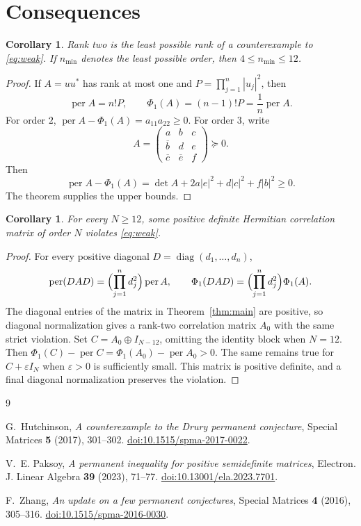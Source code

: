 \documentclass[11pt]{amsart}
\newcommand{\permanent}{\operatorname{per}}
\newcommand{\PhiOne}{\Phi_1}
\newtheorem{corollary}[theorem]{Corollary}
\begin{document}
\section{Consequences}

\begin{corollary}\label{cor:minimal}
Rank two is the least possible rank of a counterexample to \eqref{eq:weak}.
If $n_{\min}$ denotes the least possible order, then
$4\leq n_{\min}\leq12$.
\end{corollary}

\begin{proof}
If $A=uu^*$ has rank at most one and
$P=\prod_{j=1}^n|u_j|^2$, then
\[
  \permanent A=n!P,
  \qquad
  \PhiOne(A)=(n-1)!P=\frac1n\permanent A.
\]
For order $2$, $\permanent A-\PhiOne(A)=a_{11}a_{22}\geq0$. For order $3$,
write
\[
 A=\begin{pmatrix}
 a&b&c\\ \overline b&d&e\\ \overline c&\overline e&f
 \end{pmatrix}\succeq0.
\]
Then
\[
 \permanent A-\PhiOne(A)
 =\det A+2a|e|^2+d|c|^2+f|b|^2\geq0.
\]
The theorem supplies the upper bounds.
\end{proof}

\begin{corollary}\label{cor:pd}
For every $N\geq12$, some positive definite Hermitian correlation matrix of
order $N$ violates \eqref{eq:weak}.
\end{corollary}

\begin{proof}
For every positive diagonal $D=\operatorname{diag}(d_1,\ldots,d_n)$,
\[
 \permanent(DAD)=\Bigl(\prod_{j=1}^n d_j^2\Bigr)\permanent A,
 \qquad
 \PhiOne(DAD)=\Bigl(\prod_{j=1}^n d_j^2\Bigr)\PhiOne(A).
\]
The diagonal entries of the matrix in Theorem~\ref{thm:main} are positive, so
diagonal normalization gives a rank-two correlation matrix $A_0$ with the
same strict violation. Set $C=A_0\oplus I_{N-12}$, omitting the identity block
when $N=12$. Then
$\PhiOne(C)-\permanent C=\PhiOne(A_0)-\permanent A_0>0$. The same remains
true for $C+\varepsilon I_N$ when $\varepsilon>0$ is sufficiently small.
This matrix is positive definite, and a final diagonal normalization preserves
the violation.
\end{proof}

\begin{thebibliography}{9}

G.~Hutchinson,
\emph{A counterexample to the Drury permanent conjecture},
Special Matrices \textbf{5} (2017), 301--302.
\href{https://doi.org/10.1515/spma-2017-0022}
{doi:10.1515/spma-2017-0022}.

V.~E. Paksoy,
\emph{A permanent inequality for positive semidefinite matrices},
Electron. J. Linear Algebra \textbf{39} (2023), 71--77.
\href{https://doi.org/10.13001/ela.2023.7701}
{doi:10.13001/ela.2023.7701}.

F.~Zhang,
\emph{An update on a few permanent conjectures},
Special Matrices \textbf{4} (2016), 305--316.
\href{https://doi.org/10.1515/spma-2016-0030}
{doi:10.1515/spma-2016-0030}.

\end{thebibliography}
\end{document}
